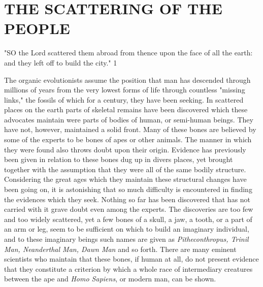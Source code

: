 \chapter{THE SCATTERING OF THE PEOPLE}

"SO the Lord scattered them abroad from thence upon the face of all the earth: and they left
off to build the city." 1

The organic evolutionists assume the position that man has descended through millions of
years from the very lowest forms of life through countless "missing links," the fossils of
which for a century, they have been seeking. In scattered places on the earth parts of skeletal
remains have been discovered which these advocates maintain were parts of bodies of
human, or semi-human beings. They have not, however, maintained a solid front. Many of
these bones are believed by some of the experts to be bones of apes or other animals. The
manner in which they were found also throws doubt upon their origin. Evidence has
previously been given in relation to these bones dug up in divers places, yet brought together
with the assumption that they were all of the same bodily structure. Considering the great
ages which they maintain these structural changes have been going on, it is astonishing that
so much difficulty is encountered in finding the evidences which they seek. Nothing so far
has been discovered that has not carried with it grave doubt even among the experts. The
discoveries are too few and too widely scattered, yet a few bones of a skull, a jaw, a tooth, or
a part of an arm or leg, seem to be sufficient on which to build an imaginary individual, and
to these imaginary beings such names are given as \textit{Pitheconthropus, Trinil Man, Neanderthal
Man, Dawn Man} and so forth. There are many eminent scientists who maintain that these
bones, if human at all, do not present evidence that they constitute a criterion by which a
whole race of intermediary creatures between the ape and \textit{Homo Sapiens}, or modern man,
can be shown.

